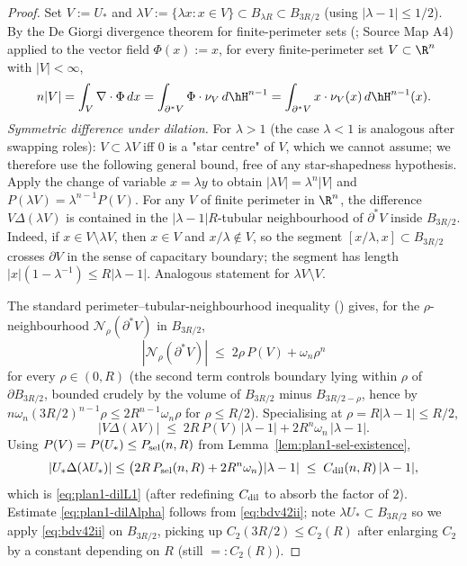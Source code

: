 \begin{proof}
Set $V:=U_*$ and $\lambda V:=\{\lambda x:x\in V\}\subset B_{\lambda R}
\subset B_{3R/2}$ (using $|\lambda-1|\le1/2$). By the De Giorgi
divergence theorem for finite-perimeter sets
(\cite[Thm.~16.3]{Maggi2012}; Source Map A4) applied to the vector field
$\Phi(x):=x$, for every finite-perimeter set $V\subset\R^n$ with
$|V|<\infty$,
\[
n|V|=\int_V \nabla\cdot\Phi\,dx=\int_{\partial^*V}\Phi\cdot\nu_V\,d\hH^{n-1}
=\int_{\partial^*V} x\cdot\nu_V(x)\,d\hH^{n-1}(x).
\]
\emph{Symmetric difference under dilation.} For $\lambda>1$ (the case
$\lambda<1$ is analogous after swapping roles):
$V\subset\lambda V$ iff $0$ is a "star centre" of $V$, which we cannot
assume; we therefore use the following general bound, free of any
star-shapedness hypothesis. Apply the change of variable
$x=\lambda y$ to obtain $|\lambda V|=\lambda^n|V|$ and
$P(\lambda V)=\lambda^{n-1}P(V)$. For any $V$ of finite perimeter in
$\R^n$, the difference $V\Delta(\lambda V)$ is contained in the
$|\lambda-1|R$-tubular neighbourhood of $\partial^*V$ inside
$B_{3R/2}$. Indeed, if $x\in V\setminus\lambda V$, then $x\in V$ and
$x/\lambda\notin V$, so the segment $[x/\lambda,x]\subset B_{3R/2}$
crosses $\partial V$ in the sense of capacitary boundary; the segment
has length $|x|(1-\lambda^{-1})\le R|\lambda-1|$. Analogous statement
for $\lambda V\setminus V$.

The standard perimeter--tubular-neighbourhood inequality
(\cite[Lemma~17.9 / Eq.~(17.6)]{Maggi2012}) gives, for the
$\rho$-neighbourhood $\mathcal N_\rho(\partial^*V)$ in $B_{3R/2}$,
\[
|\mathcal N_\rho(\partial^*V)|\;\le\;2\rho\,P(V)+\omega_n\rho^{n}
\]
for every $\rho\in(0,R)$ (the second term controls boundary lying
within $\rho$ of $\partial B_{3R/2}$, bounded crudely by the volume of
$B_{3R/2}$ minus $B_{3R/2-\rho}$, hence by
$n\omega_n(3R/2)^{n-1}\rho\le 2R^{n-1}\omega_n\rho$ for
$\rho\le R/2$). Specialising at $\rho=R|\lambda-1|\le R/2$,
\[
|V\Delta(\lambda V)|
\;\le\;2R\,P(V)\,|\lambda-1|
+2R^{n}\omega_n\,|\lambda-1|.
\]
Using $P(V)=P(U_*)\le P_{\rm sel}(n,R)$ from
Lemma~\ref{lem:plan1-sel-existence},
\[
|U_*\Delta(\lambda U_*)|\le \bigl(2R\,P_{\rm sel}(n,R)
+2R^{n}\omega_n\bigr)|\lambda-1|
\;\le\;C_{\rm dil}(n,R)\,|\lambda-1|,
\]
which is \eqref{eq:plan1-dilL1} (after redefining $C_{\rm dil}$ to
absorb the factor of $2$). Estimate \eqref{eq:plan1-dilAlpha} follows
from \eqref{eq:bdv42ii}; note $\lambda U_*\subset B_{3R/2}$ so we apply
\eqref{eq:bdv42ii} on $B_{3R/2}$, picking up $C_2(3R/2)\le C_2(R)$
after enlarging $C_2$ by a constant depending on $R$ (still
$=:C_2(R)$).
\end{proof}

